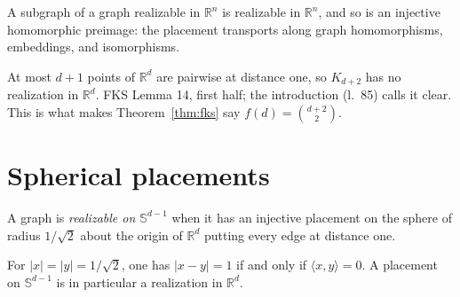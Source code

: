 \begin{lemma}[Monotonicity]
  \label{lem:monotone}
  \leanok
  A subgraph of a graph realizable in $\mathbb{R}^n$ is realizable in $\mathbb{R}^n$, and so
  is an injective homomorphic preimage: the placement transports along graph homomorphisms,
  embeddings, and isomorphisms.
\end{lemma}

\begin{lemma}
  \label{lem:complete-lower}
  \leanok
  At most $d + 1$ points of $\mathbb{R}^d$ are pairwise at distance one, so $K_{d+2}$ has no
  realization in $\mathbb{R}^d$. FKS Lemma 14, first half; the introduction (l.~85) calls it
  clear. This is what makes Theorem~\ref{thm:fks} say $f(d) = \binom{d+2}{2}$.
\end{lemma}

\section{Spherical placements}

\begin{definition}
  \label{def:sphere}
  \leanok
  A graph is \emph{realizable on $\mathbb{S}^{d-1}$} when it has an injective placement on
  the sphere of radius $1/\sqrt 2$ about the origin of $\mathbb{R}^d$ putting every edge at
  distance one.
\end{definition}

\begin{lemma}
  \label{lem:sphere-orth}
  \leanok
  For $\lvert x\rvert = \lvert y\rvert = 1/\sqrt 2$, one has $\lvert x - y\rvert = 1$ if and
  only if $\langle x, y\rangle = 0$. A placement on $\mathbb{S}^{d-1}$ is in particular a
  realization in $\mathbb{R}^d$.
\end{lemma}

